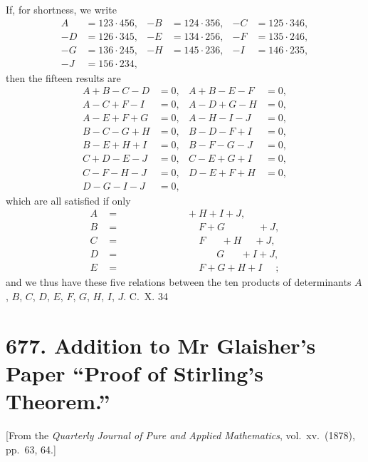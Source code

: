 \documentclass[12pt,a4paper]{article}
\theoremstyle{cayley}
\theoremstyle{definition}
\numberwithin{equation}{section}
\begin{document}
If, for shortness, we write
\begin{align*}
A &= 123 \cdot 456, & -B &= 124 \cdot 356, & -C &= 125 \cdot 346, \\
-D &= 126 \cdot 345, & -E &= 134 \cdot 256, & -F &= 135 \cdot 246, \\
-G &= 136 \cdot 245, & -H &= 145 \cdot 236, & -I &= 146 \cdot 235, \\
-J &= 156 \cdot 234,
\end{align*}
then the fifteen results are
\begin{align*}
A + B - C - D &= 0, & A + B - E - F &= 0, \\
A - C + F - I &= 0, & A - D + G - H &= 0, \\
A - E + F + G &= 0, & A - H - I - J &= 0, \\
B - C - G + H &= 0, & B - D - F + I &= 0, \\
B - E + H + I &= 0, & B - F - G - J &= 0, \\
C + D - E - J &= 0, & C - E + G + I &= 0, \\
C - F - H - J &= 0, & D - E + F + H &= 0, \\
D - G - I - J &= 0,
\end{align*}
which are all satisfied if only
\begin{align*}
A &= \phantom{B + C + D + E} + H + I + J, \\
B &= \phantom{A + C + D + E +} F + G \phantom{+ H + I} + J, \\
C &= \phantom{A + B + D + E +} F \phantom{+ G} + H \phantom{+ I} + J, \\
D &= \phantom{A + B + C + E +} \phantom{F +} G \phantom{+ H} + I + J, \\
E &= \phantom{A + B + C + D +} F + G + H + I \phantom{+ J};
\end{align*}
and we thus have these five relations between the ten products of determinants $A$, $B$, $C$, $D$, $E$, $F$, $G$, $H$, $I$, $J$.
\hfill C.~X. 34

\newpage

\section*{677. Addition to Mr Glaisher's Paper ``Proof of Stirling's Theorem.''}

[From the \textit{Quarterly Journal of Pure and Applied Mathematics}, vol.\ xv.\ (1878), pp.\ 63, 64.]
\end{document}
